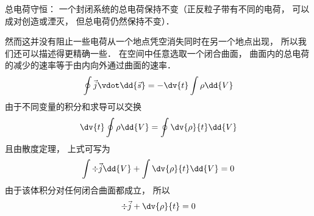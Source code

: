 
总电荷守恒： 一个封闭系统的总电荷保持不变（正反粒子带有不同的电荷， 可以成对创造或湮灭， 但总电荷仍然保持不变）．

然而这并没有阻止一些电荷从一个地点凭空消失同时在另一个地点出现， 所以我们还可以描述得更精确一些． 在空间中任意选取一个闭合曲面， 曲面内的总电荷的减少的速率等于由内向外通过曲面的速率．
\begin{equation}
\oint \vec j \vdot \dd{\vec s}  =  - \dv{t} \int \rho \dd{V}
\end{equation} 
由于不同变量的积分和求导可以交换
\begin{equation}
\dv{t} \oint \rho  \dd{V}  = \oint \dv{\rho}{t} \dd{V}
\end{equation}
且由散度定理， 上式可写为
\begin{equation}
\int \div \vec j \dd{V}  + \int \dv{\rho}{t} \dd{V}  = 0
\end{equation} 
由于该体积分对任何闭合曲面都成立， 所以
\begin{equation}
\div \vec j + \dv{\rho}{t} = 0
\end{equation} 